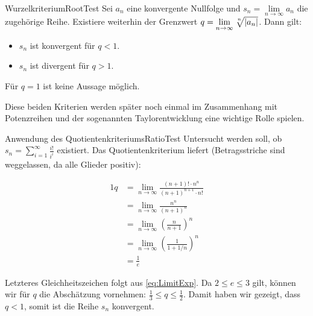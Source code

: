 \begin{statement}{Wurzelkriterium}{RootTest}
    Sei $a_n$ eine konvergente Nullfolge und $s_n = \lim\limits_{n\to\infty} a_n$ die zugehörige Reihe. Existiere weiterhin der Grenzwert $q = \lim\limits_{n\to\infty} \nroot{n}{|a_n|}$. Dann gilt:

    \begin{itemize}
        \item $s_n$ ist konvergent für $q < 1$.
        \item $s_n$ ist divergent für $q > 1$.
    \end{itemize}

    Für $q=1$ ist keine Aussage möglich.
\end{statement}

Diese beiden Kriterien werden später noch einmal im Zusammenhang mit Potenzreihen und der sogenannten Taylorentwicklung eine wichtige Rolle spielen.

\begin{example}{Anwendung des Quotientenkriteriums}{RatioTest}
    Untersucht werden soll, ob $s_n = \sum\limits_{i=1}^\infty \frac{i!}{i^i}$ existiert. Das Quotientenkriterium liefert (Betragsstriche sind weggelassen, da alle Glieder positiv):

    \begin{alignat*}{1}
        q &= \lim\limits_{n\to\infty} \frac{(n+1)! \cdot n^n}{(n+1)^{n+1} \cdot n!} \\
          &= \lim\limits_{n\to\infty} \frac{n^n}{(n+1)^n} \\
          &= \lim\limits_{n\to\infty} \left(\frac{n}{n+1}\right)^n \\
          &= \lim\limits_{n\to\infty} \left( \frac{1}{1+1/n} \right)^n \\
          &= \frac{1}{e}
    \end{alignat*}

    Letzteres Gleichheitszeichen folgt aus \ref{eq:LimitExp}. Da $2\le e \le 3$ gilt, können wir für $q$ die Abschätzung vornehmen: $\frac{1}{3} \le q \le \frac{1}{2}$. Damit haben wir gezeigt, dass $q < 1$, somit ist die Reihe $s_n$ konvergent.
\end{example}
